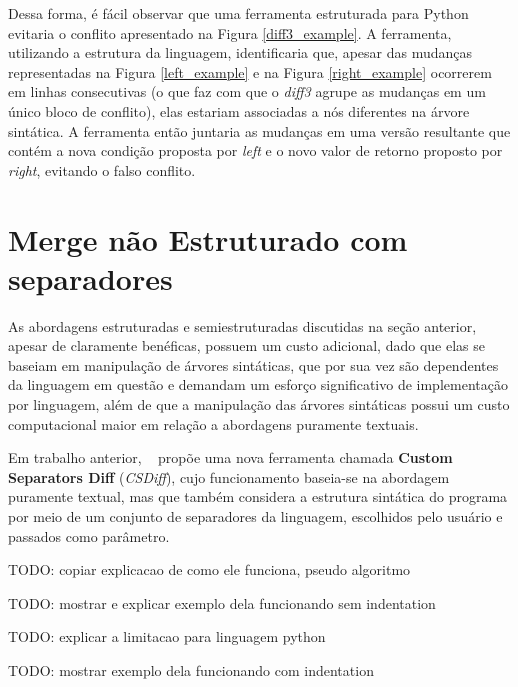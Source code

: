 Dessa forma, é fácil observar que uma ferramenta estruturada para Python evitaria o
conflito apresentado na Figura \ref{diff3_example}. A ferramenta, utilizando a estrutura da
linguagem, identificaria que, apesar das mudanças representadas na Figura \ref{left_example} e na
Figura \ref{right_example} ocorrerem em linhas consecutivas (o que faz com que o \emph{diff3}
agrupe as mudanças em um único bloco de conflito),
elas estariam associadas a nós diferentes na árvore
sintática. A ferramenta então juntaria as mudanças em uma versão resultante que contém a
nova condição proposta por \emph{left} e o novo valor de retorno proposto por \emph{right},
evitando o falso conflito.

\section{Merge não Estruturado com separadores}
As abordagens estruturadas e semiestruturadas discutidas na seção anterior, apesar de claramente benéficas,
possuem um custo adicional, dado que elas se baseiam em manipulação de árvores sintáticas, que por sua vez são
dependentes da linguagem em questão e demandam um esforço significativo de implementação por linguagem, além de que
a manipulação das árvores sintáticas possui um custo computacional maior em relação a abordagens puramente textuais.

Em trabalho anterior, ~\citeauthor{clem21} propõe uma nova ferramenta chamada
\textbf{Custom Separators Diff} (\emph{CSDiff}), cujo funcionamento baseia-se na abordagem puramente textual, mas que também
considera a estrutura sintática do programa por meio de um conjunto de separadores da linguagem, escolhidos pelo usuário e
passados como parâmetro. 

TODO: copiar explicacao de como ele funciona, pseudo algoritmo

TODO: mostrar e explicar exemplo dela funcionando sem indentation

TODO: explicar a limitacao para linguagem python

TODO: mostrar exemplo dela funcionando com indentation



